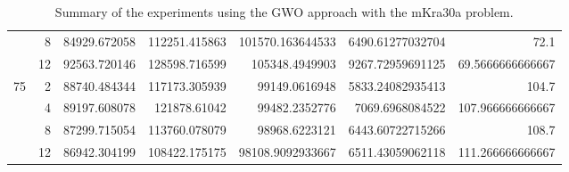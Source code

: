 \begin{table}
{{\begin{tabular}{|r|r|r|r|r|r|r|}
	\cline{2-7}
	& 8                               & 84929.672058                       & 112251.415863                       & 101570.163644533                   & 6490.61277032704                        & 72.1                                            \\ 
	\cline{2-7}
	& 12                              & 92563.720146                       & 128598.716599                       & 105348.4949903                     & 9267.72959691125                        & 69.5666666666667                                \\ 
	\hline
	\multirow{4}{*}{75}                      & 2                               & 88740.484344                       & 117173.305939                       & 99149.0616948                      & 5833.24082935413                        & 104.7                                           \\ 
	\cline{2-7}
	& 4                               & 89197.608078                       & 121878.61042                        & 99482.2352776                      & 7069.6968084522                         & 107.966666666667                                \\ 
	\cline{2-7}
	& 8                               & 87299.715054                       & 113760.078079                       & 98968.6223121                      & 6443.60722715266                        & 108.7                                           \\ 
	\cline{2-7}
	& 12                              & 86942.304199                       & 108422.175175                       & 98108.9092933667                   & 6511.43059062118                        & 111.266666666667                                \\
	\hline
\end{tabular}}}
\caption{Summary of the experiments using the GWO approach with the mKra30a problem.}
\label{full-data-gwo-mkra30a}
\end{table}

